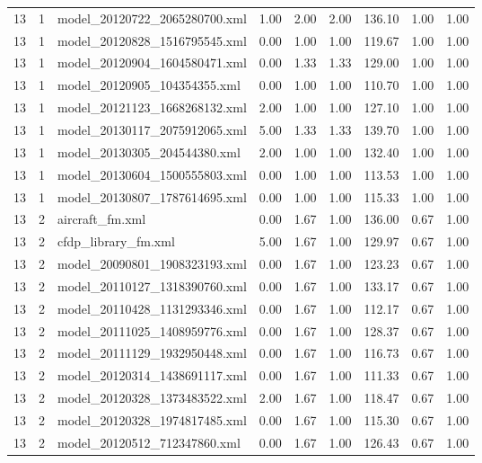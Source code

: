 \begin{table}[ht]
\begin{tabular}{rrlrrrrrr}
   13 &   1 & model\_20120722\_2065280700.xml & 1.00 & 2.00 & 2.00 & 136.10 & 1.00 & 1.00 \\ 
   13 &   1 & model\_20120828\_1516795545.xml & 0.00 & 1.00 & 1.00 & 119.67 & 1.00 & 1.00 \\ 
   13 &   1 & model\_20120904\_1604580471.xml & 0.00 & 1.33 & 1.33 & 129.00 & 1.00 & 1.00 \\ 
   13 &   1 & model\_20120905\_104354355.xml & 0.00 & 1.00 & 1.00 & 110.70 & 1.00 & 1.00 \\ 
   13 &   1 & model\_20121123\_1668268132.xml & 2.00 & 1.00 & 1.00 & 127.10 & 1.00 & 1.00 \\ 
   13 &   1 & model\_20130117\_2075912065.xml & 5.00 & 1.33 & 1.33 & 139.70 & 1.00 & 1.00 \\ 
   13 &   1 & model\_20130305\_204544380.xml & 2.00 & 1.00 & 1.00 & 132.40 & 1.00 & 1.00 \\ 
   13 &   1 & model\_20130604\_1500555803.xml & 0.00 & 1.00 & 1.00 & 113.53 & 1.00 & 1.00 \\ 
   13 &   1 & model\_20130807\_1787614695.xml & 0.00 & 1.00 & 1.00 & 115.33 & 1.00 & 1.00 \\ 
   13 &   2 & aircraft\_fm.xml & 0.00 & 1.67 & 1.00 & 136.00 & 0.67 & 1.00 \\ 
   13 &   2 & cfdp\_library\_fm.xml & 5.00 & 1.67 & 1.00 & 129.97 & 0.67 & 1.00 \\ 
   13 &   2 & model\_20090801\_1908323193.xml & 0.00 & 1.67 & 1.00 & 123.23 & 0.67 & 1.00 \\ 
   13 &   2 & model\_20110127\_1318390760.xml & 0.00 & 1.67 & 1.00 & 133.17 & 0.67 & 1.00 \\ 
   13 &   2 & model\_20110428\_1131293346.xml & 0.00 & 1.67 & 1.00 & 112.17 & 0.67 & 1.00 \\ 
   13 &   2 & model\_20111025\_1408959776.xml & 0.00 & 1.67 & 1.00 & 128.37 & 0.67 & 1.00 \\ 
   13 &   2 & model\_20111129\_1932950448.xml & 0.00 & 1.67 & 1.00 & 116.73 & 0.67 & 1.00 \\ 
   13 &   2 & model\_20120314\_1438691117.xml & 0.00 & 1.67 & 1.00 & 111.33 & 0.67 & 1.00 \\ 
   13 &   2 & model\_20120328\_1373483522.xml & 2.00 & 1.67 & 1.00 & 118.47 & 0.67 & 1.00 \\ 
   13 &   2 & model\_20120328\_1974817485.xml & 0.00 & 1.67 & 1.00 & 115.30 & 0.67 & 1.00 \\ 
   13 &   2 & model\_20120512\_712347860.xml & 0.00 & 1.67 & 1.00 & 126.43 & 0.67 & 1.00 \\ 

\end{tabular}
\end{table}
